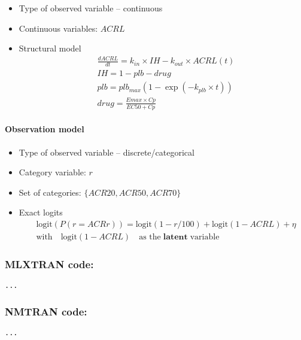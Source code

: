 \begin{itemize}
\item
Type of observed variable -- continuous
\item
Continuous variables: $ACRL$
\item
Structural model
\begin{align}
& \frac{d ACRL}{dt} = k_{in} \times IH - k_{out} \times ACRL(t) \nonumber \\
& IH = 1 - plb - drug \nonumber \\
& plb = plb_{max} (1 - \exp(-k_{plb} \times t)) \nonumber \\
& drug = \frac{Emax \times Cp}{EC50 + Cp} \nonumber 
\end{align}
\end{itemize}

\paragraph{Observation model}

\begin{itemize}
\item
Type of observed variable -- discrete/categorical
\item
Category variable: $r$
\item
Set of categories: $\{ACR20,ACR50,ACR70\}$
\item
Exact logits
\begin{align}
& \text{logit}(P(r = ACRr)) = \text{logit}(1-r/100) + \text{logit}(1-ACRL) + \eta \nonumber \\
& \text{with} \quad \text{logit}(1 - ACRL) \quad  \text{as the} \; \textbf{latent} \; \text{variable} \nonumber 
\end{align}
\end{itemize}


\subsubsection{MLXTRAN code:}
\myStartLine

\lstset{language=MLXTRANcode}
\begin{lstlisting}
...
\end{lstlisting}
\myEndLine

\subsubsection{NMTRAN code:}
\myStartLine

\lstset{language=NONMEMdataSet}
\begin{lstlisting}
...
\end{lstlisting}
\myEndLine

